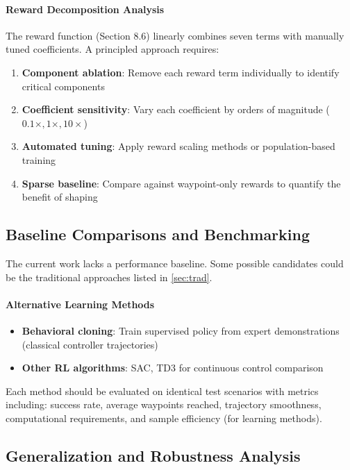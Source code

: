 \documentclass[11pt,a4paper,twocolumn]{article}
\begin{document}
\paragraph{Reward Decomposition Analysis}
The reward function (Section 8.6) linearly combines seven terms with manually tuned coefficients. A principled approach requires:
\begin{enumerate}
    \item \textbf{Component ablation}: Remove each reward term individually to identify critical components
    \item \textbf{Coefficient sensitivity}: Vary each coefficient by orders of magnitude ($0.1\times, 1\times, 10\times$)
    \item \textbf{Automated tuning}: Apply reward scaling methods or population-based training
    \item \textbf{Sparse baseline}: Compare against waypoint-only rewards to quantify the benefit of shaping
\end{enumerate}

\subsection{Baseline Comparisons and Benchmarking}

The current work lacks a performance baseline. Some possible candidates could be the traditional approaches listed in \ref{sec:trad}.

\paragraph{Alternative Learning Methods}
\begin{itemize}
    \item \textbf{Behavioral cloning}: Train supervised policy from expert demonstrations (classical controller trajectories)
    \item \textbf{Other RL algorithms}: SAC, TD3 for continuous control comparison
\end{itemize}

Each method should be evaluated on identical test scenarios with metrics including: success rate, average waypoints reached, trajectory smoothness, computational requirements, and sample efficiency (for learning methods).

\subsection{Generalization and Robustness Analysis}
\end{document}
